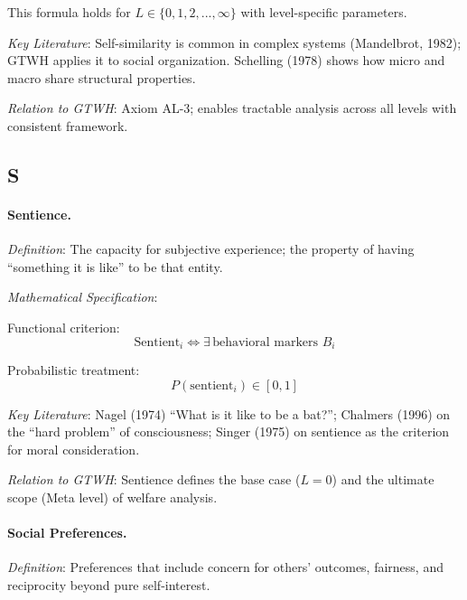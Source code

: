\documentclass[12pt,a4paper]{article}
\begin{document}
This formula holds for $L \in \{0, 1, 2, ..., \infty\}$ with level-specific parameters.

\textit{Key Literature}: Self-similarity is common in complex systems (Mandelbrot, 1982); 
GTWH applies it to social organization. Schelling (1978) shows how micro and macro 
share structural properties.

\textit{Relation to GTWH}: Axiom AL-3; enables tractable analysis across all levels 
with consistent framework.

\subsection*{S}

\paragraph{Sentience.}
\textit{Definition}: The capacity for subjective experience; the property of 
having ``something it is like'' to be that entity.

\textit{Mathematical Specification}:

Functional criterion:
\begin{equation}
\text{Sentient}_i \iff \exists \, \text{behavioral markers } B_i
\end{equation}

Probabilistic treatment:
\begin{equation}
P(\text{sentient}_i) \in [0, 1]
\end{equation}

\textit{Key Literature}: Nagel (1974) ``What is it like to be a bat?''; 
Chalmers (1996) on the ``hard problem'' of consciousness; Singer (1975) on 
sentience as the criterion for moral consideration.

\textit{Relation to GTWH}: Sentience defines the base case ($L = 0$) and the 
ultimate scope (Meta level) of welfare analysis.

\medskip

\paragraph{Social Preferences.}
\textit{Definition}: Preferences that include concern for others' outcomes, 
fairness, and reciprocity beyond pure self-interest.
\end{document}
